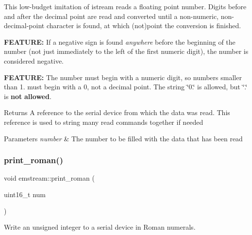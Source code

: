 This low-\/budget imitation of {\ttfamily istream} reads a floating point number. Digits before and after the decimal point are read and converted until a non-\/numeric, non-\/decimal-\/point character is found, at which (not)point the conversion is finished. \begin{DoxyItemize}
\item {\bfseries F\+E\+A\+T\+U\+RE\+:} If a negative sign is found {\itshape anywhere} before the beginning of the number (not just immediately to the left of the first numeric digit), the number is considered negative. \item {\bfseries F\+E\+A\+T\+U\+RE\+:} The number must begin with a numeric digit, so numbers smaller than 1. must begin with a 0, not a decimal point. The string \char`\"{}0.\char`\"{} is allowed, but \char`\"{}.\char`\"{} is {\bfseries not} {\bfseries allowed}. \begin{DoxyReturn}{Returns}
A reference to the serial device from which the data was read. This reference is used to string many read commands together if needed 
\end{DoxyReturn}

\begin{DoxyParams}{Parameters}
{\em number} & The number to be filled with the data that has been read \\
\hline
\end{DoxyParams}
\end{DoxyItemize}
\mbox{\label{classemstream_a54b87cf8b620a80e7f4f69445973158a}} 
\subsubsection{\texorpdfstring{print\+\_\+roman()}{print\_roman()}}
{\footnotesize\ttfamily void emstream\+::print\+\_\+roman (\begin{DoxyParamCaption}\item[{uint16\+\_\+t}]{num }\end{DoxyParamCaption})\hspace{0.3cm}{\ttfamily [protected]}}



Write an unsigned integer to a serial device in Roman numerals. 

